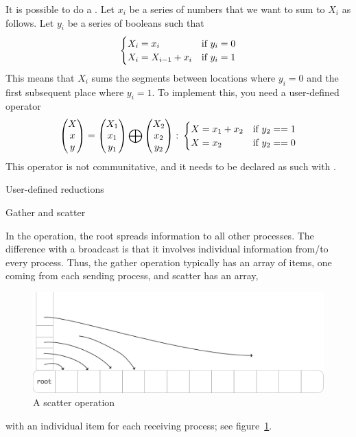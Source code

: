 It is possible to do a . Let $x_i$ be a series of numbers
that we want to sum to $X_i$ as follows. Let $y_i$ be a series of booleans such that
\[ 
\begin{cases}
  X_i=x_i&\hbox{if $y_i=0$}\\
  X_i=X_{i-1}+x_i&\hbox{if $y_i=1$}
\end{cases}
\]
This means that $X_i$ sums the segments between locations where $y_i=0$ and the
first subsequent place where $y_i=1$. To implement this, you need a user-defined operator
\[ 
\begin{pmatrix}  X\\ x\\ y\end{pmatrix}
=
\begin{pmatrix}  X_1\\ x_1\\ y_1\end{pmatrix}
\bigoplus
\begin{pmatrix}  X_2\\ x_2\\ y_2\end{pmatrix}\colon
  \begin{cases}
    X=x_1+x_2&\hbox{if $y_2==1$}\\ X=x_2&\hbox{if $y_2==0$}
  \end{cases}
\]
This operator is not communitative, and it needs to be declared as such
with .

 {User-defined reductions}
\label{mpi:op-create}

 {Gather and scatter}

In the  operation, the root spreads information to
all other processes. The difference with a broadcast is that it involves
individual information from/to every process. Thus, the gather operation typically 
has an array of items, one coming from each sending process, and scatter has an array,
\begin{figure}[ht]
  \includegraphics[scale=.12]{graphics/scatter-simple}
  \caption{A scatter operation}
  \label{fig:scatter}
\end{figure}
with an individual item for each receiving process; see figure~\ref{fig:scatter}.

